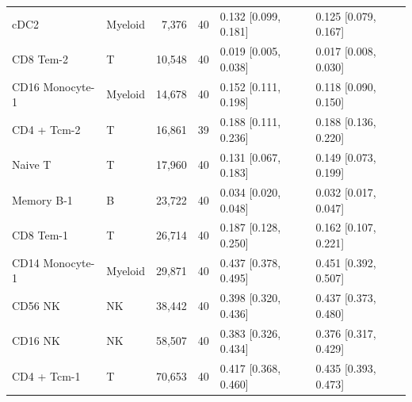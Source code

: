 \begin{longtable}{llrrll}
cDC2 & Myeloid & 7,376 & 40 & 0.132 [0.099, 0.181] & 0.125 [0.079, 0.167] \\
CD8 Tem-2 & T & 10,548 & 40 & 0.019 [0.005, 0.038] & 0.017 [0.008, 0.030] \\
CD16 Monocyte-1 & Myeloid & 14,678 & 40 & 0.152 [0.111, 0.198] & 0.118 [0.090, 0.150] \\
CD4 + Tcm-2 & T & 16,861 & 39 & 0.188 [0.111, 0.236] & 0.188 [0.136, 0.220] \\
Naive T & T & 17,960 & 40 & 0.131 [0.067, 0.183] & 0.149 [0.073, 0.199] \\
Memory B-1 & B & 23,722 & 40 & 0.034 [0.020, 0.048] & 0.032 [0.017, 0.047] \\
CD8 Tem-1 & T & 26,714 & 40 & 0.187 [0.128, 0.250] & 0.162 [0.107, 0.221] \\
CD14 Monocyte-1 & Myeloid & 29,871 & 40 & 0.437 [0.378, 0.495] & 0.451 [0.392, 0.507] \\
CD56 NK & NK & 38,442 & 40 & 0.398 [0.320, 0.436] & 0.437 [0.373, 0.480] \\
CD16 NK & NK & 58,507 & 40 & 0.383 [0.326, 0.434] & 0.376 [0.317, 0.429] \\
CD4 + Tcm-1 & T & 70,653 & 40 & 0.417 [0.368, 0.460] & 0.435 [0.393, 0.473] \\
\end{longtable}
\endgroup
